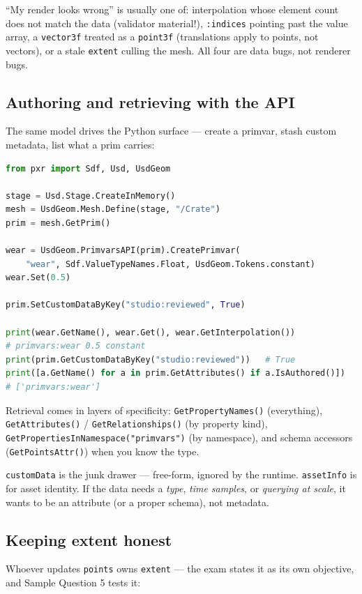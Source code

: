 \begin{Gotcha}
``My render looks wrong'' is usually one of: interpolation whose element
count does not match the data (validator material!), \texttt{:indices}
pointing past the value array, a \texttt{vector3f} treated as a
\texttt{point3f} (translations apply to points, not vectors), or a stale
\texttt{extent} culling the mesh. All four are data bugs, not renderer bugs.
\end{Gotcha}

\subsection{Authoring and retrieving with the API}\label{sec:dm-api}
The same model drives the Python surface --- create a primvar, stash custom
metadata, list what a prim carries:

\begin{lstlisting}[language=Python]
from pxr import Sdf, Usd, UsdGeom

stage = Usd.Stage.CreateInMemory()
mesh = UsdGeom.Mesh.Define(stage, "/Crate")
prim = mesh.GetPrim()

wear = UsdGeom.PrimvarsAPI(prim).CreatePrimvar(
    "wear", Sdf.ValueTypeNames.Float, UsdGeom.Tokens.constant)
wear.Set(0.5)

prim.SetCustomDataByKey("studio:reviewed", True)

print(wear.GetName(), wear.Get(), wear.GetInterpolation())
# primvars:wear 0.5 constant
print(prim.GetCustomDataByKey("studio:reviewed"))   # True
print([a.GetName() for a in prim.GetAttributes() if a.IsAuthored()])
# ['primvars:wear']
\end{lstlisting}

\noindent Retrieval comes in layers of specificity:
\texttt{GetPropertyNames()} (everything), \texttt{GetAttributes()} /
\texttt{GetRelationships()} (by property kind),
\texttt{GetPropertiesInNamespace("primvars")} (by namespace), and schema
accessors (\texttt{GetPointsAttr()}) when you know the type.

\begin{ExamTip}
\texttt{customData} is the junk drawer --- free-form, ignored by the runtime.
\texttt{assetInfo} is for asset identity. If the data needs a \emph{type},
\emph{time samples}, or \emph{querying at scale}, it wants to be an
attribute (or a proper schema), not metadata.
\end{ExamTip}

\subsection{Keeping extent honest}\label{sec:dm-extent}
Whoever updates \texttt{points} owns \texttt{extent} --- the
exam states it as its own objective, and Sample Question 5 tests it:


